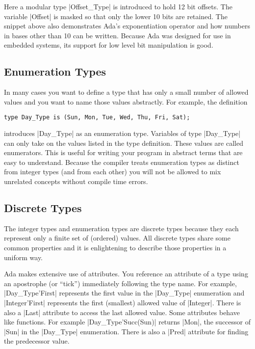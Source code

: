 \noindent Here a modular type |Offset_Type| is introduced to hold 12 bit offsets. The variable
|Offset| is masked so that only the lower 10 bits are retained. The snippet above also
demonstrates Ada's exponentiation operator and how numbers in bases other than 10 can be
written. Because Ada was designed for use in embedded systems, its support for low level bit
manipulation is good.

\subsection{Enumeration Types}

In many cases you want to define a type that has only a small number of allowed values and you
want to name those values abstractly. For example, the definition

\begin{lstlisting}
type Day_Type is (Sun, Mon, Tue, Wed, Thu, Fri, Sat);
\end{lstlisting}

\noindent introduces |Day_Type| as an enumeration type. Variables of type |Day_Type| can only
take on the values listed in the type definition. These values are called enumerators. This is
useful for writing your program in abstract terms that are easy to understand. Because the
compiler treats enumeration types as distinct from integer types (and from each other) you will
not be allowed to mix unrelated concepts without compile time errors.

\subsection{Discrete Types}

The integer types and enumeration types are discrete types because they each represent only a
finite set of (ordered) values. All discrete types share some common properties and it is
enlightening to describe those properties in a uniform way.

Ada makes extensive use of attributes. You reference an attribute of a type using an apostrophe
(or ``tick'') immediately following the type name. For example, |Day_Type'First| represents the
first value in the |Day_Type| enumeration and |Integer'First| represents the first (smallest)
allowed value of |Integer|. There is also a |Last| attribute to access the last allowed value.
Some attributes behave like functions. For example |Day_Type'Succ(Sun)| returns |Mon|, the
successor of |Sun| in the |Day_Type| enumeration. There is also a |Pred| attribute for finding
the predecessor value.

